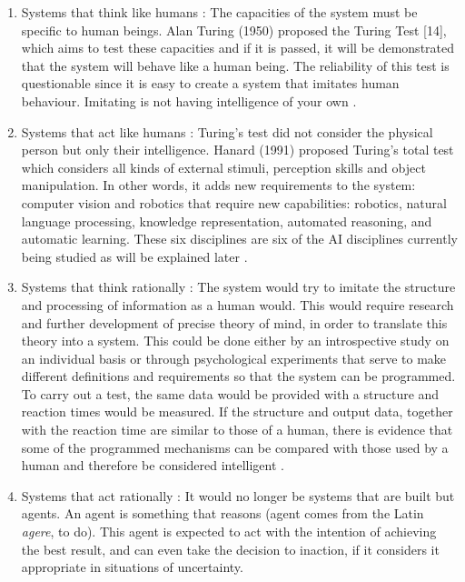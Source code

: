 \begin{enumerate}
\item Systems that think like humans \cite{haugeland, bellman}: The capacities of the system must be specific to human beings. Alan Turing (1950) proposed the Turing Test [14], which aims to test these capacities and if it is passed, it will be demonstrated that the system will behave like a human being. The reliability of this test is questionable since it is easy to create a system that imitates human behaviour. Imitating is not having intelligence of your own \cite{amodernapproach}.

\item Systems that act like humans \cite{kurzweil, knight}: Turing's test did not consider the physical person but only their intelligence. Hanard (1991) proposed Turing's total test \cite{harnad} which considers all kinds of external stimuli, perception skills and object manipulation. In other words, it adds new requirements to the system: computer vision and robotics that require new capabilities: robotics, natural language processing, knowledge representation, automated reasoning, and automatic learning. These six disciplines are six of the AI disciplines currently being studied as will be explained later \cite{amodernapproach}.

\item Systems that think rationally \cite{charniak, winston}: The system would try to imitate the structure and processing of information as a human would. This would require research and further development of precise theory of mind, in order to translate this theory into a system. This could be done either by an introspective study on an individual basis or through psychological experiments that serve to make different definitions and requirements so that the system can be programmed. To carry out a test, the same data would be provided with a structure and reaction times would be measured. If the structure and output data, together with the reaction time are similar to those of a human, there is evidence that some of the programmed mechanisms can be compared with those used by a human and therefore be considered intelligent \cite{amodernapproach}.

\item Systems that act rationally \cite{poole, nilsson}: It would no longer be systems that are built but agents. An agent is something that reasons (agent comes from the Latin \textit{agere}, to do). This agent is expected to act with the intention of achieving the best result, and can even take the decision to inaction, if it considers it appropriate in situations of uncertainty.
 

\end{enumerate}
